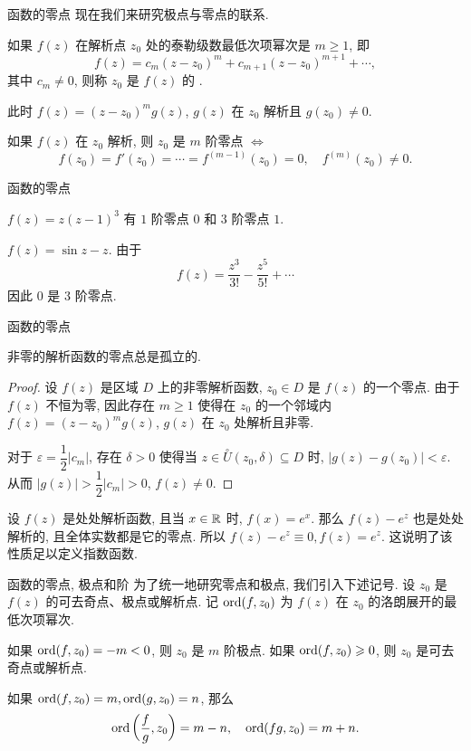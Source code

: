 \begin{frame}{函数的零点}
\onslide<+->
现在我们来研究极点与零点的联系.
\begin{definition}
如果 $f(z)$ 在解析点 $z_0$ 处的泰勒级数最低次项幂次是 $m\ge1$, 即
\[f(z)=c_m(z-z_0)^m+c_{m+1}(z-z_0)^{m+1}+\cdots,\]
其中 $c_m\neq 0$, 则称 $z_0$ 是 $f(z)$ 的 .
\end{definition}
\onslide<+->
此时 $f(z)=(z-z_0)^mg(z)$, $g(z)$ 在 $z_0$ 解析且 $g(z_0)\neq 0$.

\begin{theorem}
如果 $f(z)$ 在 $z_0$ 解析, 则 $z_0$ 是 $m$ 阶零点 $\iff$
\[f(z_0)=f'(z_0)=\cdots=f^{(m-1)}(z_0)=0,\quad
f^{(m)}(z_0)\neq 0.\]
\end{theorem}
\end{frame}


\begin{frame}{函数的零点}
\begin{example}
$f(z)=z(z-1)^3$
\onslide<+->
有 $1$ 阶零点 $0$ 和 $3$ 阶零点 $1$.
\end{example}
\begin{example}
$f(z)=\sin z-z$.
\onslide<+->
由于
\[f(z)=\frac{z^3}{3!}-\frac{z^5}{5!}+\cdots\]
因此 $0$ 是 $3$ 阶零点.
\end{example}
\end{frame}


\begin{frame}{函数的零点}
\begin{theorem}
非零的解析函数的零点总是孤立的.
\end{theorem}
\begin{proof}
\indent
设 $f(z)$ 是区域 $D$ 上的非零解析函数, $z_0\in D$ 是 $f(z)$ 的一个零点.
\onslide<+->
由于 $f(z)$ 不恒为零, 因此存在 $m\ge 1$ 使得在 $z_0$ 的一个邻域内 $f(z)=(z-z_0)^m g(z)$, $g(z)$ 在 $z_0$ 处解析且非零.

\indent
\onslide<+->
对于 $\varepsilon=\dfrac12|c_m|$, 存在 $\delta>0$ 使得当 $z\in \stackrel{\circ}{U}(z_0,\delta)\subseteq D$ 时, $|g(z)-g(z_0)|<\varepsilon$.
\onslide<+->
从而 $|g(z)|>\dfrac12|c_m|>0$, $f(z)\neq 0$.
\end{proof}

\onslide<+->
设 $f(z)$ 是处处解析函数, 且当 $x\in{\mathbb{R}}$ 时, $f(x)=e^x$.
\onslide<+->
那么 $f(z)-e^z$ 也是处处解析的, 且全体实数都是它的零点.
\onslide<+->
所以 $f(z)-e^z\equiv0,f(z)=e^z$.
\onslide<+->
这说明了该性质足以定义指数函数.
\end{frame}


\begin{frame}{函数的零点, 极点和阶}
\onslide<+->
为了统一地研究零点和极点, 我们引入下述记号.
\onslide<+->
设 $z_0$ 是 $f(z)$ 的可去奇点、极点或解析点.
\onslide<+->
记 ${\mathrm{ord}}(f,z_0)$ 为 $f(z)$ 在 $z_0$ 的洛朗展开的最低次项幂次.

\onslide<+->
如果 ${\mathrm{ord}}(f,z_0)=-m<0$, 则 $z_0$ 是 $m$ 阶极点.
\onslide<+->
如果 ${\mathrm{ord}}(f,z_0)\geqslant 0$, 则 $z_0$ 是可去奇点或解析点.

\begin{conclusion}[可去奇点和极点判定方法]
如果 ${\mathrm{ord}}(f,z_0)=m,{\mathrm{ord}}(g,z_0)=n$, 那么
\[{\mathrm{ord}}\left(\frac fg,z_0\right)=m-n,\quad{\mathrm{ord}}(fg,z_0)=m+n.\]
\end{conclusion}
\end{frame}


